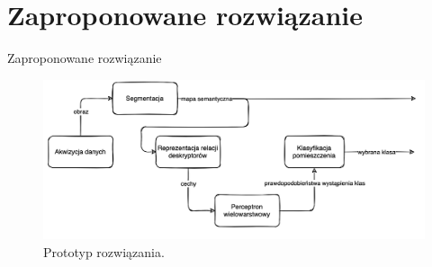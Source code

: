 \documentclass[10pt]{beamer}
\begin{document}
            \section[Zaproponowane rozwiązanie]{Zaproponowane rozwiązanie}
            \begin{frame}{Zaproponowane rozwiązanie}
                
                \begin{figure}
                    \includegraphics[width=\textwidth]{images/own-solution.png}
                    \caption{Prototyp rozwiązania.}
                \end{figure}
                
\end{frame}
\end{document}
